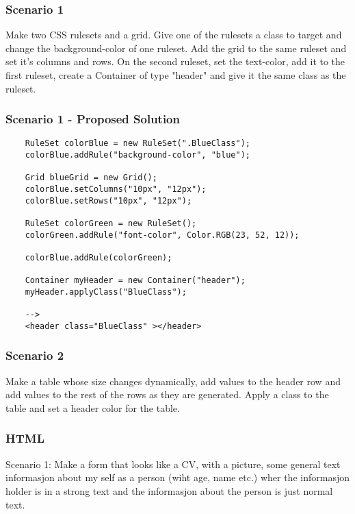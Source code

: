 \documentclass[12pt]{article}
\begin{document}
\subsubsection{Scenario 1}
Make two CSS rulesets and a grid. Give one of the rulesets a class to target and change the background-color of one ruleset. Add the grid to the same ruleset and set it's columns and rows. On the second ruleset, set the text-color, add it to the first ruleset, create a Container of type "header" and give it the same class as the ruleset.

\subsubsection{Scenario 1 - Proposed Solution}

\begin{lstlisting}
    RuleSet colorBlue = new RuleSet(".BlueClass");
    colorBlue.addRule("background-color", "blue");

    Grid blueGrid = new Grid();
    colorBlue.setColumns("10px", "12px");
    colorBlue.setRows("10px", "12px");

    RuleSet colorGreen = new RuleSet();
    colorGreen.addRule("font-color", Color.RGB(23, 52, 12));

    colorBlue.addRule(colorGreen);

    Container myHeader = new Container("header");
    myHeader.applyClass("BlueClass");

    -->
    <header class="BlueClass" ></header>
\end{lstlisting}


\subsubsection{Scenario 2}
Make a table whose size changes dynamically, add values to the header row and add values to the rest of the rows as they are generated. Apply a class to the table and set a header color for the table.

    \subsubsection{HTML}

    Scenario 1: Make a form that looks like a CV, with a picture, some general text informasjon about my self as a person (wiht age, name etc.) wher the informasjon holder is in a strong text and the informasjon about the person is just normal text.
\end{document}
